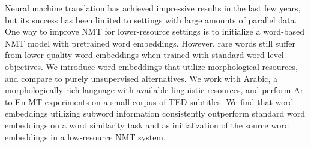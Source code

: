 Neural machine translation has achieved impressive results in the last few years, but its success has been limited to settings with large amounts of parallel data. One way to improve NMT for lower-resource settings is to initialize a word-based NMT model with pretrained word embeddings. However, rare words still suffer from lower quality word embeddings when trained with standard word-level objectives. We introduce word embeddings that utilize morphological resources, and compare to purely unsupervised alternatives. We work with Arabic, a morphologically rich language with available linguistic resources, and perform Ar-to-En MT experiments on a small corpus of TED subtitles. We find that word embeddings utilizing subword information consistently outperform standard word embeddings on a word similarity task and as initialization of the source word embeddings in a low-resource NMT system.
